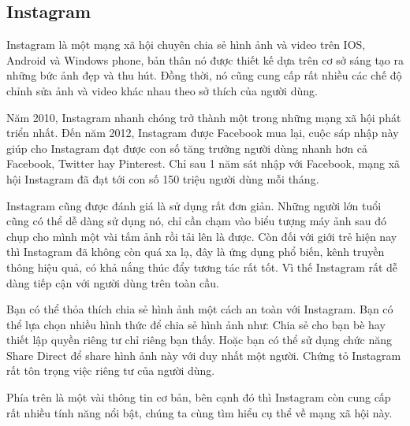 \subsection{Instagram}

Instagram là một mạng xã hội chuyên chia sẻ hình ảnh và video trên IOS, Android và Windows phone, bản thân nó được thiết kế dựa trên cơ sở sáng tạo ra những bức ảnh đẹp và thu hút. Đồng thời, nó cũng cung cấp rất nhiều các chế độ chỉnh sửa ảnh và video khác nhau theo sở thích của người dùng.\\ \par

Năm 2010, Instagram nhanh chóng trở thành một trong những mạng xã hội phát triển nhất. Đến năm 2012, Instagram được Facebook mua lại, cuộc sáp nhập này giúp cho Instagram đạt được con số tăng trưởng người dùng nhanh hơn cả Facebook, Twitter hay Pinterest. Chỉ sau 1 năm sát nhập với 
 Facebook, mạng xã hội Instagram đã đạt tới con số 150 triệu người dùng mỗi tháng.\\ \par
\par

Instagram cũng được đánh giá là sử dụng rất đơn giản. Những người lớn tuổi cũng có thể dễ dàng sử dụng nó, chỉ cần chạm vào biểu tượng máy ảnh sau đó chụp cho mình một vài tấm ảnh rồi tải lên là được. Còn đối với giới trẻ hiện nay thì Instagram đã không còn quá xa lạ, đây là ứng dụng phổ biến, kênh truyền thông hiệu quả, có khả nắng thúc đẩy tương tác rất tốt. Vì thế Instagram rất dễ dàng tiếp cận với người dùng trên toàn cầu. \\ \par

Bạn có thể thỏa thích chia sẻ hình ảnh một cách an toàn với Instagram. Bạn có thể lựa chọn nhiều hình thức để chia sẻ hình ảnh như: Chia sẻ cho bạn bè hay thiết lập quyền riêng tư chỉ riêng bạn thấy. Hoặc bạn có thể sử dụng chức năng Share Direct để share hình ảnh này với duy nhất một người. Chứng tỏ Instagram rất tôn trọng việc riêng tư của người dùng.\\ \par 

Phía trên là một vài thông tin cơ bản, bên cạnh đó thì Instagram còn cung cấp rất nhiều tính năng nổi bật, chúng ta cùng tìm hiểu cụ thể về mạng xã hội này.\\ \par

